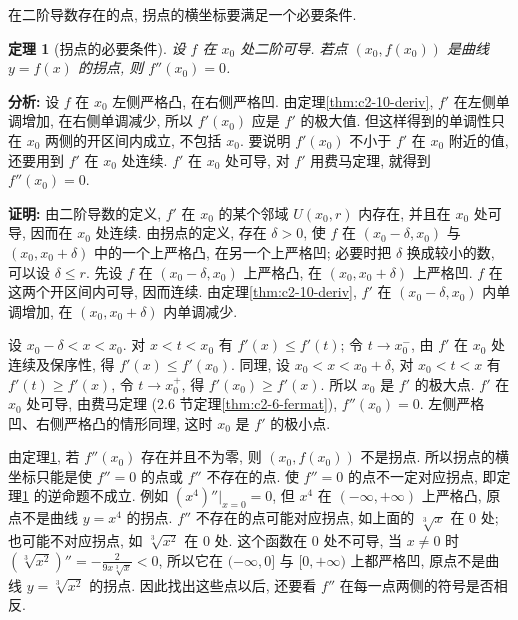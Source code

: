 \documentclass[UTF8,openany]{ctexbook}
\theoremstyle{chinesetextbook}
\newtheorem{theorem}{定理}[section]
\newenvironment{cnproof}{\par\indent\textbf{证明:} \ignorespaces}{\par}
\begin{document}
在二阶导数存在的点, 拐点的横坐标要满足一个必要条件.
\begin{theorem}[拐点的必要条件]\label{thm:c2-10-inflection}
设 $f$ 在 $x_0$ 处二阶可导. 若点 $(x_0,f(x_0))$ 是曲线 $y=f(x)$ 的拐点, 则 $f''(x_0)=0$.
\end{theorem}
\par\indent\textbf{分析:} 设 $f$ 在 $x_0$ 左侧严格凸, 在右侧严格凹. 由定理\ref{thm:c2-10-deriv}, $f'$ 在左侧单调增加, 在右侧单调减少, 所以 $f'(x_0)$ 应是 $f'$ 的极大值. 但这样得到的单调性只在 $x_0$ 两侧的开区间内成立, 不包括 $x_0$. 要说明 $f'(x_0)$ 不小于 $f'$ 在 $x_0$ 附近的值, 还要用到 $f'$ 在 $x_0$ 处连续. $f'$ 在 $x_0$ 处可导, 对 $f'$ 用费马定理, 就得到 $f''(x_0)=0$.
\begin{cnproof}
由二阶导数的定义, $f'$ 在 $x_0$ 的某个邻域 $U(x_0,r)$ 内存在, 并且在 $x_0$ 处可导, 因而在 $x_0$ 处连续. 由拐点的定义, 存在 $\delta>0$, 使 $f$ 在 $(x_0-\delta,x_0)$ 与 $(x_0,x_0+\delta)$ 中的一个上严格凸, 在另一个上严格凹; 必要时把 $\delta$ 换成较小的数, 可以设 $\delta\le r$. 先设 $f$ 在 $(x_0-\delta,x_0)$ 上严格凸, 在 $(x_0,x_0+\delta)$ 上严格凹. $f$ 在这两个开区间内可导, 因而连续. 由定理\ref{thm:c2-10-deriv}, $f'$ 在 $(x_0-\delta,x_0)$ 内单调增加, 在 $(x_0,x_0+\delta)$ 内单调减少.

设 $x_0-\delta<x<x_0$. 对 $x<t<x_0$ 有 $f'(x)\le f'(t)$; 令 $t\to x_0^-$, 由 $f'$ 在 $x_0$ 处连续及保序性, 得 $f'(x)\le f'(x_0)$. 同理, 设 $x_0<x<x_0+\delta$, 对 $x_0<t<x$ 有 $f'(t)\ge f'(x)$, 令 $t\to x_0^+$, 得 $f'(x_0)\ge f'(x)$. 所以 $x_0$ 是 $f'$ 的极大点. $f'$ 在 $x_0$ 处可导, 由费马定理 (2.6 节定理\ref{thm:c2-6-fermat}), $f''(x_0)=0$. 左侧严格凹、右侧严格凸的情形同理, 这时 $x_0$ 是 $f'$ 的极小点.
\end{cnproof}
由定理\ref{thm:c2-10-inflection}, 若 $f''(x_0)$ 存在并且不为零, 则 $(x_0,f(x_0))$ 不是拐点. 所以拐点的横坐标只能是使 $f''=0$ 的点或 $f''$ 不存在的点. 使 $f''=0$ 的点不一定对应拐点, 即定理\ref{thm:c2-10-inflection} 的逆命题不成立. 例如 $(x^4)''\big|_{x=0}=0$, 但 $x^4$ 在 $(-\infty,+\infty)$ 上严格凸, 原点不是曲线 $y=x^4$ 的拐点. $f''$ 不存在的点可能对应拐点, 如上面的 $\sqrt[3]x$ 在 $0$ 处; 也可能不对应拐点, 如 $\sqrt[3]{x^2}$ 在 $0$ 处. 这个函数在 $0$ 处不可导, 当 $x\ne0$ 时 $\displaystyle(\sqrt[3]{x^2})''=-\frac2{9x\sqrt[3]x}<0$, 所以它在 $(-\infty,0]$ 与 $[0,+\infty)$ 上都严格凹, 原点不是曲线 $y=\sqrt[3]{x^2}$ 的拐点. 因此找出这些点以后, 还要看 $f''$ 在每一点两侧的符号是否相反.
\end{document}
